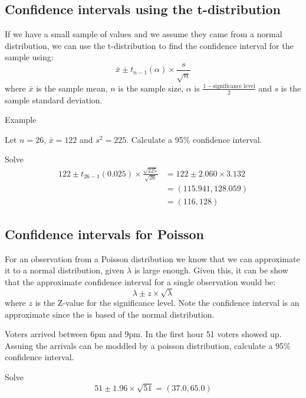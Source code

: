     \newpage
    \subsection{Confidence intervals using the t-distribution}
        If we have a small sample of values and we assume they came from a normal distribution, we can use the t-distribution to find the confidence interval for the sample using: $$ \bar{x} \pm t_{n-1}(\alpha) \times \frac{s}{\sqrt{n}} $$ where $\bar{x}$ is the sample mean, $n$ is the sample size, $\alpha$ is $\displaystyle\frac{1 - \text{significance level}}{2}$ and $s$ is the sample standard deviation.
    
        Example
        \begin{example}
        {
            Let $n = 26$, $\bar{x} = 122$ and $s^2 = 225$. Calculate a 95\% confidence interval.
        }

        \begin{step}{Solve}
        \begin{align*} 
        122 \pm t_{26-1}(0.025) \times \frac{\sqrt{225}}{\sqrt{26}} &= 122 \pm 2.060 \times 3.132 \\ 
        &= (115.941, 128.059)\\
        &= (116, 128) 
        \end{align*}         
        \end{step}

        \end{example}

    \newpage
    \subsection{Confidence intervals for Poisson}
        For an observation from a Poisson distribution we know that we can approximate it to a normal distribution, given $\lambda$ is large enough. Given this, it can be show that the approximate confidence interval for a single observation would be: 
        $$ \lambda \pm z \times \sqrt{\lambda} $$ 
        where $z$ is the Z-value for the significance level. Note the confidence interval is an approximate since the is based of the normal distribution.

        \begin{example}
        {
            Voters arrived between 6pm and 9pm. In the first hour 51 voters showed up. Assuing the arrivals can be moddled by a poisson distribution, calculate a 95\% confidence interval.
        }

        \begin{step}{Solve}
        $$ 51 \pm 1.96 \times \sqrt{51} = (37.0, 65.0) $$
        \end{step}

        \end{example}

